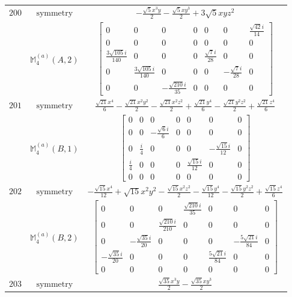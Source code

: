 \documentclass[fleqn,8pt,landscape]{jsarticle}
\begin{document}
\begin{longtable}{ccc}
$ 200 $ & $ \text{symmetry} $ & $ - \frac{\sqrt{5} x^{3} y}{2} - \frac{\sqrt{5} x y^{3}}{2} + 3 \sqrt{5} x y z^{2} $ \\
$  $ & $ \mathbb{M}_{4}^{(a)}(A,2) $ & $ \begin{bmatrix} 0 & 0 & 0 & 0 & 0 & 0 & \frac{\sqrt{42} i}{14} \\ 0 & 0 & 0 & 0 & 0 & 0 & 0 \\ \frac{3 \sqrt{105} i}{140} & 0 & 0 & 0 & \frac{\sqrt{7} i}{28} & 0 & 0 \\ 0 & \frac{3 \sqrt{105} i}{140} & 0 & 0 & 0 & - \frac{\sqrt{7} i}{28} & 0 \\ 0 & 0 & - \frac{\sqrt{210} i}{35} & 0 & 0 & 0 & 0 \end{bmatrix} $ \\ \hline
$ 201 $ & $ \text{symmetry} $ & $ \frac{\sqrt{21} x^{4}}{6} - \frac{\sqrt{21} x^{2} y^{2}}{2} - \frac{\sqrt{21} x^{2} z^{2}}{2} + \frac{\sqrt{21} y^{4}}{6} - \frac{\sqrt{21} y^{2} z^{2}}{2} + \frac{\sqrt{21} z^{4}}{6} $ \\
$  $ & $ \mathbb{M}_{4}^{(a)}(B,1) $ & $ \begin{bmatrix} 0 & 0 & 0 & 0 & 0 & 0 & 0 \\ 0 & 0 & - \frac{\sqrt{6} i}{6} & 0 & 0 & 0 & 0 \\ 0 & \frac{i}{4} & 0 & 0 & 0 & - \frac{\sqrt{15} i}{12} & 0 \\ \frac{i}{4} & 0 & 0 & 0 & \frac{\sqrt{15} i}{12} & 0 & 0 \\ 0 & 0 & 0 & 0 & 0 & 0 & 0 \end{bmatrix} $ \\ \hline
$ 202 $ & $ \text{symmetry} $ & $ - \frac{\sqrt{15} x^{4}}{12} + \sqrt{15} x^{2} y^{2} - \frac{\sqrt{15} x^{2} z^{2}}{2} - \frac{\sqrt{15} y^{4}}{12} - \frac{\sqrt{15} y^{2} z^{2}}{2} + \frac{\sqrt{15} z^{4}}{6} $ \\
$  $ & $ \mathbb{M}_{4}^{(a)}(B,2) $ & $ \begin{bmatrix} 0 & 0 & 0 & \frac{\sqrt{210} i}{35} & 0 & 0 & 0 \\ 0 & 0 & \frac{\sqrt{210} i}{210} & 0 & 0 & 0 & 0 \\ 0 & - \frac{\sqrt{35} i}{20} & 0 & 0 & 0 & - \frac{5 \sqrt{21} i}{84} & 0 \\ - \frac{\sqrt{35} i}{20} & 0 & 0 & 0 & \frac{5 \sqrt{21} i}{84} & 0 & 0 \\ 0 & 0 & 0 & 0 & 0 & 0 & 0 \end{bmatrix} $ \\ \hline
$ 203 $ & $ \text{symmetry} $ & $ \frac{\sqrt{35} x^{3} y}{2} - \frac{\sqrt{35} x y^{3}}{2} $ \\

\end{longtable}
\end{document}

